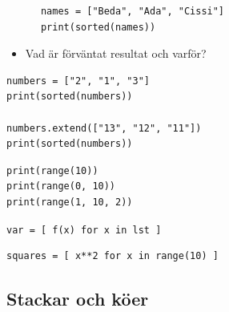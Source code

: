 \begin{frame}[fragile]
  \begin{example}[Sortering]
    \begin{verbatim}
      names = ["Beda", "Ada", "Cissi"]
      print(sorted(names))
    \end{verbatim}
  \end{example}

  \begin{exercise}
    \begin{itemize}
      \item Vad är förväntat resultat och varför?
    \end{itemize}
    \begin{verbatim}
numbers = ["2", "1", "3"]
print(sorted(numbers))

numbers.extend(["13", "12", "11"])
print(sorted(numbers))
    \end{verbatim}
  \end{exercise}
\end{frame}

\begin{frame}[fragile]
  \begin{example}
    \begin{verbatim}
print(range(10))
print(range(0, 10))
print(range(1, 10, 2))
    \end{verbatim}
  \end{example}
\end{frame}


\begin{frame}[fragile]
  \texttt{var = [ f(x) for x in lst ]}
\end{frame}

\begin{frame}[fragile]
  \begin{example}
    \begin{verbatim}
squares = [ x**2 for x in range(10) ]
    \end{verbatim}
  \end{example}
\end{frame}


\subsection{Stackar och köer}

\begin{frame}[fragile]
  \begin{example}[pile.py]
    \inputminted{python}{examples/pile.py}
  \end{example}
\end{frame}

